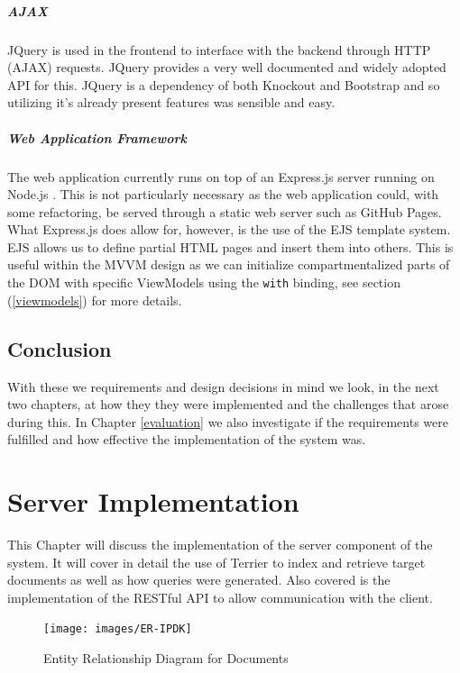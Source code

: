\documentclass{l4proj}
\newcommand{\code}[1]{\texttt{#1}}
\begin{document}
\paragraph{AJAX}
JQuery is used in the frontend to interface with the backend through HTTP (AJAX) requests. JQuery provides a very well documented and widely adopted API for this. JQuery is a dependency of both Knockout and Bootstrap and so utilizing it's already present features was sensible and easy.

\paragraph{Web Application Framework}
The web application currently runs on top of an Express.js server running on Node.js \cite{express} \cite{node}. This is not particularly necessary as the web application could, with some refactoring, be served through a static web server such as GitHub Pages. What Express.js does allow for, however, is the use of the EJS template system. EJS allows us to define partial HTML pages and insert them into others. This is useful within the MVVM design as we can initialize compartmentalized parts of the DOM with specific ViewModels using the \code{with} binding, see section (\ref{viewmodels}) for more details.


\section{Conclusion}
With these we requirements and design decisions in mind we look, in the next two chapters, at how they they were implemented and the challenges that arose during this. In Chapter \ref{evaluation} we also investigate if the requirements were fulfilled and how effective the implementation of the system was.

\chapter{Server Implementation} \label{serverimplementation}
This Chapter will discuss the implementation of the server component of the system. It will cover in detail the use of Terrier to index and retrieve target documents as well as how queries were generated. Also covered is the implementation of the RESTful API to allow communication with the client.

\begin{figure}[H]
\centering
\texttt{[image: images/ER-IPDK]}
\caption{Entity Relationship Diagram for Documents}
\label{er}
\end{figure}
\end{document}

